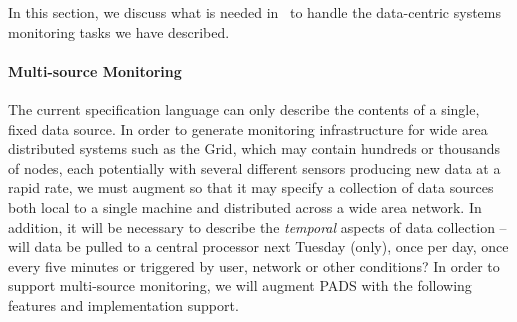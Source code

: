 
In this section, we discuss what is needed in  \pads{}\ 
to handle the data-centric systems monitoring tasks we have
described.

\paragraph*{Multi-source Monitoring}
The current \pads{} specification language can only describe
the contents of a single, fixed data source.  In order to 
generate monitoring infrastructure for
wide area distributed systems such as the Grid, which 
may contain hundreds or thousands of nodes, each 
potentially with several different sensors producing
new data at a rapid rate, we must augment \pads{}
so that it may specify a collection of data sources
both local to a single machine and distributed across a wide area network.
In addition, it will be necessary to describe the {\em temporal}
aspects of data collection -- will data be pulled to a central
processor next Tuesday (only), once per day, once every five minutes
or triggered by user, network or other conditions?
In order to support multi-source monitoring, we will augment PADS
with the following features and implementation support.


